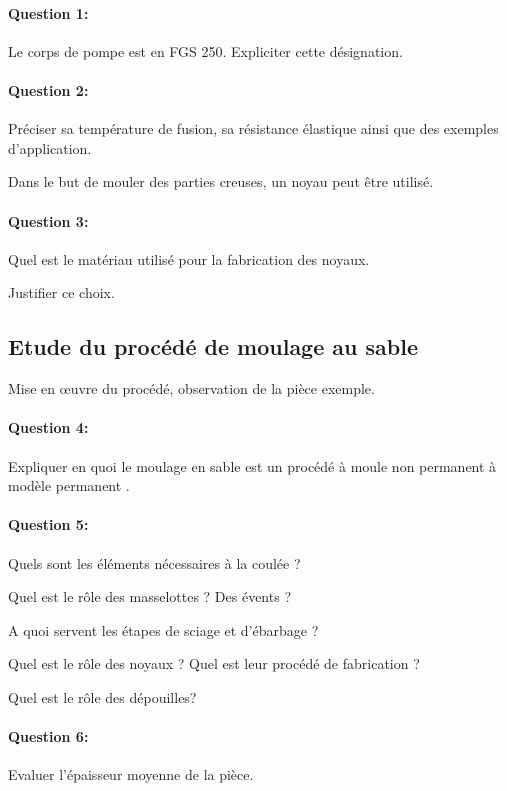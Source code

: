 \paragraph{Question 1:} Le corps de pompe est en FGS 250. Expliciter cette désignation.

\paragraph{Question 2:} Préciser sa température de fusion, sa résistance élastique ainsi que des exemples d'application.

Dans le but de mouler des parties creuses, un noyau peut être utilisé.

\paragraph{Question 3:} Quel est le matériau utilisé pour la fabrication des noyaux.

Justifier ce choix.

\subsection{Etude du procédé de moulage au sable}

Mise en \oe uvre du procédé, observation de la pièce exemple.

\paragraph{Question 4:} Expliquer en quoi le moulage en sable est un procédé à \og moule non permanent à modèle permanent \fg.

\paragraph{Question 5:} Quels sont les éléments nécessaires à la coulée ?

Quel est le rôle des masselottes ? Des évents ?

A quoi servent les étapes de sciage et d'ébarbage ?

Quel est le rôle des noyaux ? Quel est leur procédé de fabrication ?

Quel est le rôle des dépouilles?

\paragraph{Question 6:} Evaluer l'épaisseur moyenne de la pièce.


